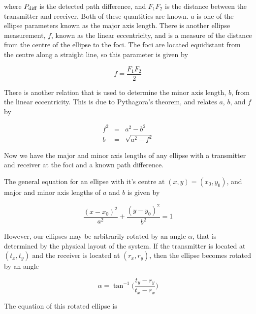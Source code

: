 \documentclass[12pt,openany,a4paper]{book}
\begin{document}
\bigskip

where $P_{\textnormal{diff}}$ is the detected path difference, and $F_1F_2$ is the distance between the transmitter and receiver. Both of these quantities are known. $a$ is one of the ellipse parameters known as the major axis length. There is another ellipse measurement, $f$, known as the linear eccentricity, and is a measure of the distance from the centre of the ellipse to the foci. The foci are located equidistant from the centre along a straight line, so this parameter is given by

\begin{equation}
f = \frac{F_1F_2}{2}
\end{equation}

\bigskip

There is another relation that is used to determine the minor axis length, $b$, from the linear eccentricity. This is due to Pythagora's theorem, and relates $a$, $b$, and $f$ by

\begin{eqnarray}
f^2 &=& a^2 - b^2 \\
b &=& \sqrt{a^2 - f^2}
\end{eqnarray}

\bigskip

Now we have the major and minor axis lengths of any ellipse with a transmitter and receiver at the foci and a known path difference. 

\bigskip

The general equation for an ellipse with it's centre at $(x,y) = (x_0,y_0)$, and major and minor axis lengths of $a$ and $b$ is given by

\begin{equation}
\frac{(x-x_0)^2}{a^2} + \frac{(y-y_0)^2}{b^2} = 1
\end{equation}

\bigskip

However, our ellipses may be arbitrarily rotated by an angle $\alpha$, that is determined by the physical layout of the system. If the transmitter is located at $(t_x,t_y)$ and the receiver is located at $(r_x,r_y)$, then the ellipse becomes rotated by an angle

\begin{equation}
\alpha = \tan^{-1}\Bigg(\frac{t_y-r_y}{t_x-r_x} \Bigg)
\end{equation}

\bigskip

The equation of this rotated ellipse is
\end{document}
